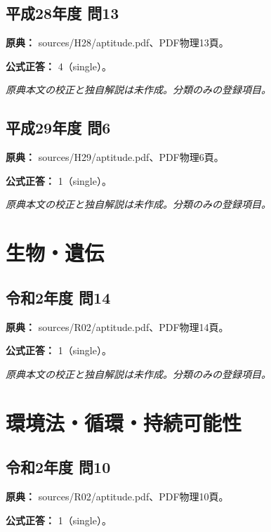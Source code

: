 \subsection{平成28年度 問13}
\label{q:h28-reg-apt-13}

\noindent\textbf{原典：} sources/H28/aptitude.pdf、PDF物理13頁。

\textbf{公式正答：} 4（single）。

\par\textit{原典本文の校正と独自解説は未作成。分類のみの登録項目。}

\subsection{平成29年度 問6}
\label{q:h29-reg-apt-06}

\noindent\textbf{原典：} sources/H29/aptitude.pdf、PDF物理6頁。

\textbf{公式正答：} 1（single）。

\par\textit{原典本文の校正と独自解説は未作成。分類のみの登録項目。}

\section{生物・遺伝}

\subsection{令和2年度 問14}
\label{q:r02-reg-apt-14}

\noindent\textbf{原典：} sources/R02/aptitude.pdf、PDF物理14頁。

\textbf{公式正答：} 1（single）。

\par\textit{原典本文の校正と独自解説は未作成。分類のみの登録項目。}

\section{環境法・循環・持続可能性}

\subsection{令和2年度 問10}
\label{q:r02-reg-apt-10}

\noindent\textbf{原典：} sources/R02/aptitude.pdf、PDF物理10頁。

\textbf{公式正答：} 1（single）。


